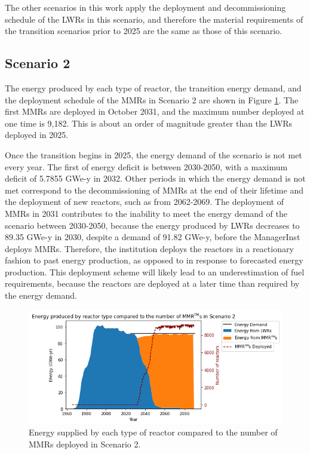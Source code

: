 The other scenarios in this work apply the deployment and decommissioning 
schedule of the \glspl{LWR} in this scenario, and therefore the material 
requirements of the transition scenarios prior to 2025 are the 
same as those of this scenario.  

\subsection{Scenario 2}
The energy produced by each type of reactor, the transition energy demand, 
and the deployment schedule of the \glspl{MMR} in Scenario 2 are shown in 
Figure \ref{fig:energy_rx_2}. The first \glspl{MMR} are deployed in 
October 2031, and the maximum number deployed at one time is 
9,182. This is about an order of magnitude greater than the \glspl{LWR}
deployed in 2025.

Once the transition begins in 2025, the energy demand of the scenario is 
not met every year. The first of energy deficit is between 2030-2050, with a 
maximum deficit 
of 5.7855 GWe-y in 2032. Other periods in which the energy demand is not met 
correspond to the decommissioning of \glspl{MMR} at the end of their lifetime 
and the deployment of new reactors, such as from 2062-2069. 
The deployment of \glspl{MMR} in 2031 contributes to the inability to 
meet the energy demand of the scenario between 2030-2050, because the energy 
produced by 
\glspl{LWR} decreases to 89.35 GWe-y in 2030, despite a demand of 91.82
GWe-y, before the \Cycamore ManagerInst deploys \glspl{MMR}.
Therefore, the institution deploys the reactors in a reactionary fashion to 
past energy production, as opposed to in response to forecasted energy 
production. This deployment scheme will likely lead to an underestimation 
of fuel requirements, because the reactors are deployed at a later time 
than required by the energy demand.

\begin{figure}
    \centering 
    \includegraphics[width=\textwidth]{../figures/energy_scenario2.png}
    \caption{Energy supplied by each type of reactor compared to the number of 
    \glspl{MMR} deployed in Scenario 2.}
    \label{fig:energy_rx_2}
\end{figure}

